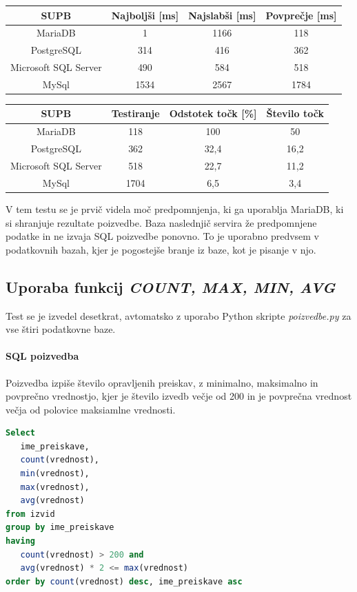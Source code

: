 \documentclass[a4paper,11pt]{report}
\begin{document}
\begin{center}
   \begin{tabular}{||c|c|c|c||}
      \hline
      \textbf{SUPB} & \textbf{Najboljši [ms]} & \textbf{Najslabši [ms]} & \textbf{Povprečje [ms]}\\
      \hline
      \hline
      MariaDB & 1 & 1166 & 118 \\
      PostgreSQL & 314 & 416 & 362 \\
      Microsoft SQL Server & 490 & 584 & 518 \\
      MySql & 1534 & 2567 & 1784\\
      \hline
   \end{tabular}
\end{center}

\begin{center}
   \begin{tabular}{||c|c|c|c||}
      \hline
      \textbf{SUPB} & \textbf{Testiranje} & \textbf{Odstotek točk [\%]} & \textbf{Število točk}\\
      \hline
      \hline
      MariaDB & 118 & 100 & 50 \\
      PostgreSQL & 362 & 32,4 & 16,2\\
      Microsoft SQL Server & 518 & 22,7 & 11,2 \\
      MySql & 1704 & 6,5 & 3,4 \\
      \hline
   \end{tabular}
\end{center}

V tem testu se je prvič videla moč predpomnjenja, ki ga uporablja MariaDB, ki si shranjuje rezultate poizvedbe.
Baza naslednjič servira že predpomnjene podatke in ne izvaja SQL poizvedbe ponovno. To je uporabno predvsem v podatkovnih bazah, kjer
je pogostejše branje iz baze, kot je pisanje v njo.

\pagebreak
\subsection{Uporaba funkcij \textit{COUNT, MAX, MIN, AVG}}
Test se je izvedel desetkrat, avtomatsko z uporabo Python skripte \textit{poizvedbe.py} za vse štiri podatkovne baze.

\paragraph{SQL poizvedba}
Poizvedba izpiše število opravljenih preiskav, z minimalno, maksimalno in povprečno vrednostjo, kjer
je število izvedb večje od 200 in je povprečna vrednost večja od polovice maksiamlne vrednosti.
\begin{lstlisting}[language = SQL]
Select 
   ime_preiskave, 
   count(vrednost), 
   min(vrednost), 
   max(vrednost), 
   avg(vrednost)
from izvid
group by ime_preiskave
having 
   count(vrednost) > 200 and 
   avg(vrednost) * 2 <= max(vrednost)
order by count(vrednost) desc, ime_preiskave asc
\end{lstlisting}
\end{document}
